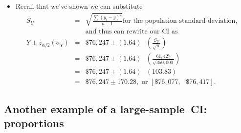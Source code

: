 \documentclass[11pt]{article}
\begin{document}
\begin{itemize}
\begin{itemize}
\item Recall that we've shown we can substitute%
\begin{eqnarray*}
S_{U} &=&\sqrt{\frac{\sum \left( y_{i}-\overline{y}\right) ^{2}}{n-1}}\text{
for the population standard deviation, } \\
&&\text{and thus can rewrite our CI as} \\
\overline{Y}\pm z_{\alpha /2}\left( \sigma _{\overline{Y}}\right)
&=&\$76,247\pm \left( 1.64\right) \text{ }\left( \frac{S_{U}}{\sqrt{n}}%
\right) \\
&=&\$76,247\pm \left( 1.64\right) \text{ }\left( \frac{61,427}{\sqrt{350,000}%
}\right) \\
&=&\$76,247\pm \left( 1.64\right) \text{ }\left( 103.83\right) \\
&=&\$76,247\pm 170.28,\text{ or }\left[ \$76,077,\text{ }\$76,417\right] .
\end{eqnarray*}
\end{itemize}
\end{itemize}

\subsection{Another example of a large-sample\ CI: proportions}
\end{document}
